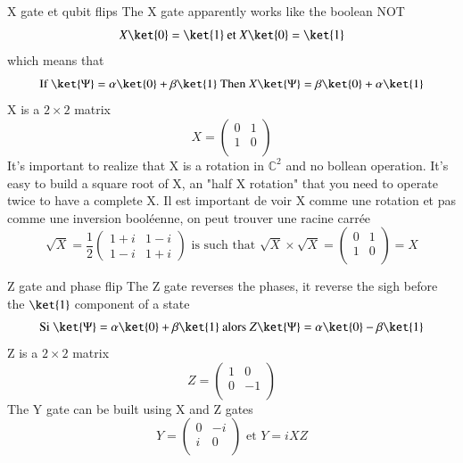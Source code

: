 \begin{frame}{X gate et qubit flips}
The X gate apparently works like the boolean NOT
\begin{equation*}
    X\ket{0} = \ket{1} \textrm{ et } X\ket{0} = \ket{1}
\end{equation*}
which means that
\begin{equation*}
    \textrm{If } \ket{\Psi} = \alpha\ket{0}+\beta\ket{1} \textrm{ Then } X\ket{\Psi} = \beta\ket{0}+\alpha\ket{1}
\end{equation*}
X is a $2\times 2$ matrix
\begin{equation*}
    X = \begin{pmatrix}
            0 & 1 \\
            1 & 0 \\
        \end{pmatrix}
\end{equation*}
It's important to realize that X is a rotation in $\mathbb{C}^2$ and no bollean operation. It's easy to build a square root 
of X, an "half X rotation" that you need to operate twice to have a complete X. 
Il est important de voir X comme une rotation et pas comme une inversion booléenne, on peut trouver une racine carrée
\begin{equation*}
     \sqrt{X} = \frac{1}{2}\begin{pmatrix} 1+i & 1 - i \\ 1 - i & 1 + i \end{pmatrix}  \textrm{ is such that }
     \sqrt{X}\times \sqrt{X} =  \begin{pmatrix} 0 & 1 \\ 1 & 0 \\ \end{pmatrix} = X
\end{equation*}
\end{frame}

\begin{frame}{Z gate and phase flip}
The Z gate reverses the phases, it reverse the sigh before the $\ket{1}$  component of a state \newline 
\begin{equation*}
    \textrm{Si } \ket{\Psi} = \alpha\ket{0}+\beta\ket{1} \textrm{ alors } Z\ket{\Psi} = \alpha\ket{0}-\beta\ket{1}
\end{equation*}
Z is a $2\times 2$ matrix
\begin{equation*}
 Z = \begin{pmatrix}
            1 & 0 \\
            0 & -1 \\
        \end{pmatrix}
\end{equation*}
The Y gate can be built using X and Z gates
\begin{equation*}
     Y = \begin{pmatrix}
            0 & -i \\
            i & 0  \\
        \end{pmatrix}  \textrm{ et } Y = iXZ
\end{equation*}
\end{frame}


